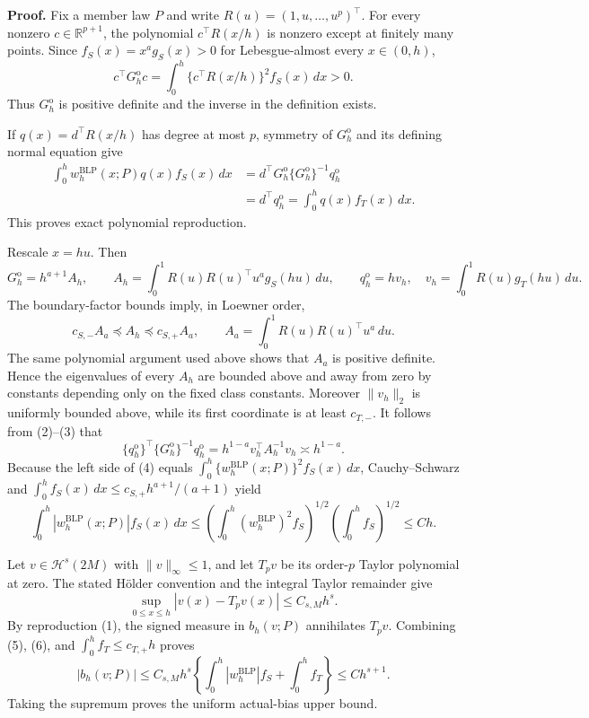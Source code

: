 \textbf{Proof.}
Fix a member law \(P\) and write \(R(u)=(1,u,\ldots,u^p)^\top\). For every nonzero \(c\in\mathbb R^{p+1}\), the polynomial \(c^\top R(x/h)\) is nonzero except at finitely many points. Since \(f_S(x)=x^ag_S(x)>0\) for Lebesgue-almost every \(x\in(0,h)\),
\[
c^\top G_h^{\mathrm o}c=\int_0^h\{c^\top R(x/h)\}^2f_S(x)\,dx>0.
\]
Thus \(G_h^{\mathrm o}\) is positive definite and the inverse in the definition exists.

If \(q(x)=d^\top R(x/h)\) has degree at most \(p\), symmetry of \(G_h^{\mathrm o}\) and its defining normal equation give
\[
\begin{aligned}
\int_0^h w_h^{\mathrm{BLP}}(x;P)q(x)f_S(x)\,dx
&=d^\top G_h^{\mathrm o}\{G_h^{\mathrm o}\}^{-1}q_h^{\mathrm o}\\
&=d^\top q_h^{\mathrm o}
=\int_0^h q(x)f_T(x)\,dx.
\end{aligned}
\tag{1}
\]
This proves exact polynomial reproduction.

Rescale \(x=hu\). Then
\[
G_h^{\mathrm o}=h^{a+1}A_h,
\qquad
A_h=\int_0^1R(u)R(u)^\top u^ag_S(hu)\,du,
\qquad
q_h^{\mathrm o}=h v_h,
\quad
v_h=\int_0^1R(u)g_T(hu)\,du.
\tag{2}
\]
The boundary-factor bounds imply, in Loewner order,
\[
c_{S,-}A_a\preceq A_h\preceq c_{S,+}A_a,
\qquad
A_a=\int_0^1R(u)R(u)^\top u^a\,du.
\tag{3}
\]
The same polynomial argument used above shows that \(A_a\) is positive definite. Hence the eigenvalues of every \(A_h\) are bounded above and away from zero by constants depending only on the fixed class constants. Moreover \(\|v_h\|_2\) is uniformly bounded above, while its first coordinate is at least \(c_{T,-}\). It follows from (2)--(3) that
\[
\{q_h^{\mathrm o}\}^\top\{G_h^{\mathrm o}\}^{-1}q_h^{\mathrm o}
=h^{1-a}v_h^\top A_h^{-1}v_h\asymp h^{1-a}.
\tag{4}
\]
Because the left side of (4) equals \(\int_0^h\{w_h^{\mathrm{BLP}}(x;P)\}^2f_S(x)\,dx\), Cauchy--Schwarz and \(\int_0^hf_S(x)\,dx\le c_{S,+}h^{a+1}/(a+1)\) yield
\[
\int_0^h|w_h^{\mathrm{BLP}}(x;P)|f_S(x)\,dx
\le
\left(\int_0^h(w_h^{\mathrm{BLP}})^2f_S\right)^{1/2}
\left(\int_0^hf_S\right)^{1/2}
\le Ch.
\tag{5}
\]

Let \(v\in\mathcal H^s(2M)\) with \(\|v\|_\infty\le1\), and let \(T_pv\) be its order-\(p\) Taylor polynomial at zero. The stated H\"older convention and the integral Taylor remainder give
\[
\sup_{0\le x\le h}|v(x)-T_pv(x)|\le C_{s,M}h^s.
\tag{6}
\]
By reproduction (1), the signed measure in \(b_h(v;P)\) annihilates \(T_pv\). Combining (5), (6), and \(\int_0^hf_T\le c_{T,+}h\) proves
\[
|b_h(v;P)|
\le C_{s,M}h^s\left\{\int_0^h|w_h^{\mathrm{BLP}}|f_S+\int_0^hf_T\right\}
\le Ch^{s+1}.
\tag{7}
\]
Taking the supremum proves the uniform actual-bias upper bound.

